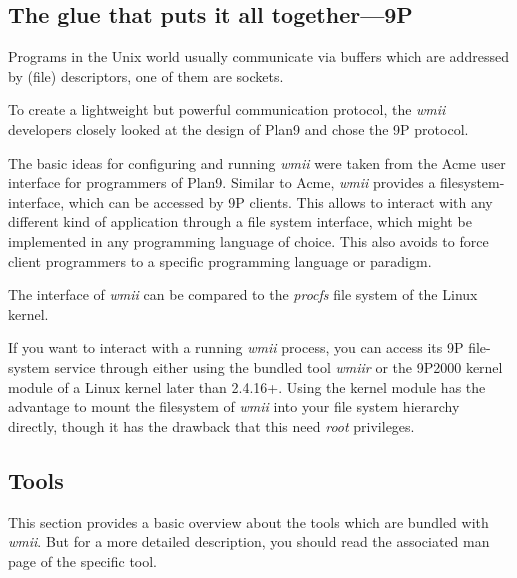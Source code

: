 \documentclass[12pt,a4paper]{article} %
\newcommand{\wmii}{\emph{wmii}}
\begin{document}
    \subsection{The glue that puts it all together---9P}

    Programs in the Unix world usually communicate via buffers which are
    addressed by (file) descriptors, one of them are sockets.

    To create a lightweight but powerful communication protocol, the \wmii
    developers closely looked at the design of Plan9 and chose the 9P
    protocol.

    The basic ideas for configuring and running \wmii{} were taken from
    the Acme user interface for programmers of Plan9. Similar to Acme,
    \wmii{} provides a filesystem-interface, which can be accessed by
    9P clients. This allows to interact with any different kind of
    application through a file system interface, which might be implemented
    in any programming language of choice. This also avoids to force
    client programmers to a specific programming language or paradigm.
    
    The interface of \wmii{} can be compared to the \emph{procfs} file
    system of the Linux kernel.

    If you want to interact with a running \wmii{} process, you can access its 9P
    file-system service through either using the bundled tool \emph{wmiir} or
    the 9P2000 kernel module of a Linux kernel later than 2.4.16+.  Using the
    kernel module has the advantage to mount the filesystem of \wmii{} into your
    file system hierarchy directly, though it has the drawback that this need
    \emph{root} privileges.

    \subsection{Tools}

    This section provides a basic overview about the tools which are bundled
    with \wmii. But for a more detailed description, you should read the associated
    man page of the specific tool.
    
\end{document}
